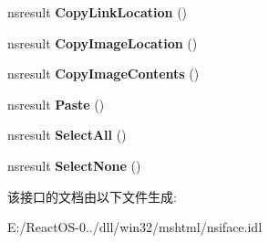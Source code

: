 \begin{DoxyCompactItemize}
nsresult {\bfseries Copy\+Link\+Location} ()
\item 
\mbox{\label{interfacens_i_clipboard_commands_a134c41ee79fc9c691ac089ced511bab4}} 
nsresult {\bfseries Copy\+Image\+Location} ()
\item 
\mbox{\label{interfacens_i_clipboard_commands_a08011047b9dbc979aa5f9f3b99571382}} 
nsresult {\bfseries Copy\+Image\+Contents} ()
\item 
\mbox{\label{interfacens_i_clipboard_commands_a889344547f5f11ede408df2394ba1fa4}} 
nsresult {\bfseries Paste} ()
\item 
\mbox{\label{interfacens_i_clipboard_commands_a7e18e4861bc3670d459a43339fe7c206}} 
nsresult {\bfseries Select\+All} ()
\item 
\mbox{\label{interfacens_i_clipboard_commands_affd55db4050fe6e28bbfd24e4ce21c7f}} 
nsresult {\bfseries Select\+None} ()
\end{DoxyCompactItemize}


该接口的文档由以下文件生成\+:\begin{DoxyCompactItemize}
\item 
E\+:/\+React\+O\+S-\/0../dll/win32/mshtml/nsiface.\+idl\end{DoxyCompactItemize}
